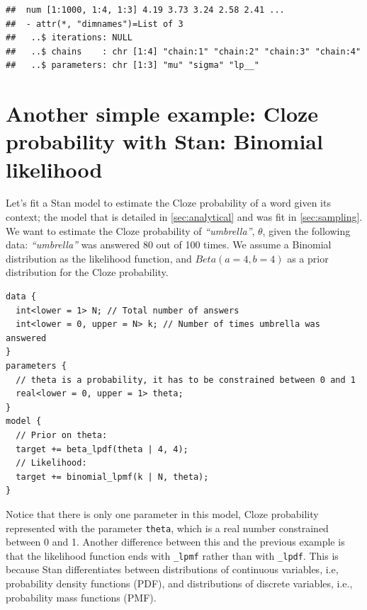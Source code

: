 \documentclass[12pt,]{krantz}
\newenvironment{Shaded}{\begin{snugshade}}{\end{snugshade}}
\newcommand{\KeywordTok}[1]{\textcolor[rgb]{0.13,0.29,0.53}{\textbf{#1}}}
\newcommand{\NormalTok}[1]{#1}
\newcommand{\OperatorTok}[1]{\textcolor[rgb]{0.81,0.36,0.00}{\textbf{#1}}}
\newcommand{\StringTok}[1]{\textcolor[rgb]{0.31,0.60,0.02}{#1}}
\theoremstyle{definition}
\theoremstyle{definition}
\theoremstyle{definition}
\theoremstyle{remark}
\begin{document}
\begin{Shaded}
\end{Shaded}

\begin{verbatim}
##  num [1:1000, 1:4, 1:3] 4.19 3.73 3.24 2.58 2.41 ...
##  - attr(*, "dimnames")=List of 3
##   ..$ iterations: NULL
##   ..$ chains    : chr [1:4] "chain:1" "chain:2" "chain:3" "chain:4"
##   ..$ parameters: chr [1:3] "mu" "sigma" "lp__"
\end{verbatim}

\hypertarget{sec:clozestan}{%
\section{Another simple example: Cloze probability with Stan: Binomial likelihood}\label{sec:clozestan}}

Let's fit a Stan model to estimate the Cloze probability of a word given its context; the model that is detailed in \ref{sec:analytical} and was fit in \ref{sec:sampling}. We want to estimate the Cloze probability of \emph{``umbrella''}, \(\theta\), given the following data: \emph{``umbrella''} was answered 80 out of 100 times. We assume a Binomial distribution as the likelihood function, and \(Beta(a=4,b=4)\) as a prior distribution for the Cloze probability.

\begin{verbatim}
data {
  int<lower = 1> N; // Total number of answers
  int<lower = 0, upper = N> k; // Number of times umbrella was answered
}
parameters {
  // theta is a probability, it has to be constrained between 0 and 1
  real<lower = 0, upper = 1> theta;
}
model {
  // Prior on theta:
  target += beta_lpdf(theta | 4, 4); 
  // Likelihood:
  target += binomial_lpmf(k | N, theta); 
}
\end{verbatim}

Notice that there is only one parameter in this model, Cloze probability represented with the parameter \texttt{theta}, which is a real number constrained between 0 and 1. Another difference between this and the previous example is that the likelihood function ends with \texttt{\_lpmf} rather than with \texttt{\_lpdf}. This is because Stan differentiates between distributions of continuous variables, i.e, probability density functions (PDF), and distributions of discrete variables, i.e., probability mass functions (PMF).
\end{document}
